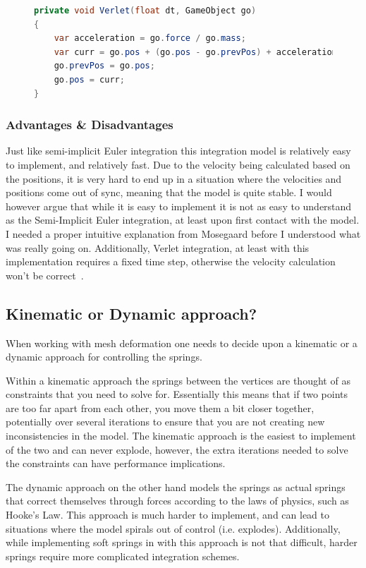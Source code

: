\begin{figure}
\begin{lstlisting}[label={code:verlet_integration},language=csharp,caption={Verlet Integration}]
private void Verlet(float dt, GameObject go)
{
    var acceleration = go.force / go.mass;
    var curr = go.pos + (go.pos - go.prevPos) + acceleration * dt * dt;
    go.prevPos = go.pos;
    go.pos = curr;
}
\end{lstlisting}
\end{figure}

\subsubsection{Advantages \& Disadvantages}
Just like semi-implicit Euler integration this integration model is relatively easy to implement, and relatively fast.
Due to the velocity being calculated based on the positions, it is very hard to end up in a situation where the velocities and positions come out of sync,
meaning that the model is quite stable.
I would however argue that while it is easy to implement it is not as easy to understand as the Semi-Implicit Euler integration, at least upon first contact with the model.
I needed a proper intuitive explanation from Mosegaard\cite{mosegaards_clothing_simulation} before I understood what was really going on.
Additionally, Verlet integration, at least with this implementation requires a fixed time step, otherwise the velocity calculation won't be correct~\cite{alan_wake_mass_spring}.

\subsection{Kinematic or Dynamic approach?}
When working with mesh deformation one needs to decide upon a kinematic or a dynamic approach for controlling the springs.

Within a kinematic approach the springs between the vertices are thought of as constraints that you need to solve for.
Essentially this means that if two points are too far apart from each other, you move them a bit closer together, potentially over several iterations to ensure that you are not creating
new inconsistencies in the model.
The kinematic approach is the easiest to implement of the two and can never explode, however, the extra iterations needed to solve the constraints can have performance implications.

The dynamic approach on the other hand models the springs as actual springs that correct themselves through forces according to the laws of physics, such as Hooke's Law.
This approach is much harder to implement, and can lead to situations where the model spirals out of control (i.e. explodes).
Additionally, while implementing soft springs in with this approach is not that difficult, harder springs require more complicated integration schemes\cite{math_for_games}.


